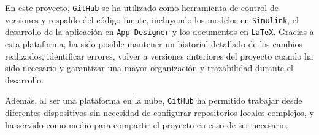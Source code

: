 En este proyecto, \texttt{GitHub} se ha utilizado como herramienta de control de versiones y respaldo del código fuente, incluyendo los modelos en \texttt{Simulink}, el desarrollo de la aplicación en \texttt{App Designer} y los documentos en \texttt{LaTeX}. Gracias a esta plataforma, ha sido posible mantener un historial detallado de los cambios realizados, identificar errores, volver a versiones anteriores del proyecto cuando ha sido necesario y garantizar una mayor organización y trazabilidad durante el desarrollo.

Además, al ser una plataforma en la nube, \texttt{GitHub} ha permitido trabajar desde diferentes dispositivos sin necesidad de configurar repositorios locales complejos, y ha servido como medio para compartir el proyecto en caso de ser necesario.

